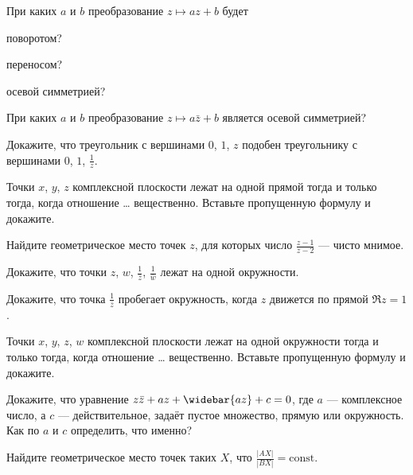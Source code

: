 \documentclass[a4paper, 12pt, num=23]{listok}
\begin{document}
\begin{problem}
	При каких $a$ и $b$ преобразование $z \mapsto az + b$ будет 
	\begin{probparts}
		\item поворотом?
		\item переносом?
		\item осевой симметрией?
	\end{probparts}
\end{problem}
\begin{problem}
	При каких $a$ и $b$ преобразование $z \mapsto a\bar z + b$ является осевой симметрией?
\end{problem}
\begin{problem}
	Докажите, что треугольник с вершинами $0$, $1$, $z$ подобен треугольнику с вершинами $0$, $1$, $\frac1z$.
\end{problem}
\begin{problem}
	Точки $x$, $y$, $z$ комплексной плоскости лежат на одной прямой тогда и только тогда, когда отношение \ldots{} вещественно. Вставьте пропущенную формулу и докажите.
\end{problem}
\begin{problem}
	Найдите геометрическое место точек $z$, для которых число $\frac{z-1}{z-2}$ --- чисто мнимое.
\end{problem}
\begin{problem}
	Докажите, что точки $z$, $w$, $\frac1{\bar z}$, $\frac1{\bar w}$ лежат на одной окружности.
\end{problem}
\begin{problem}
	Докажите, что точка $\frac1{\bar z}$ пробегает окружность, когда $z$ движется по прямой $\Re z = 1$.
\end{problem}
\begin{problem}
	Точки $x$, $y$, $z$, $w$ комплексной плоскости лежат на одной окружности тогда и только тогда, когда отношение \ldots{} вещественно.
	Вставьте пропущенную формулу и докажите.
\end{problem}
\begin{problem}
	Докажите, что уравнение $z\bar z + az + \widebar{az} + c = 0$, где $a$ --- комплексное число,
	а $c$ --- действительное, задаёт пустое множество, прямую или окружность. Как по $a$ и $c$ определить, что именно?
\end{problem}
\begin{problem}
	Найдите геометрическое место точек таких $X$, что $\frac{|AX|}{|BX|} = \mathrm{const}$.
\end{problem}
\end{document}
